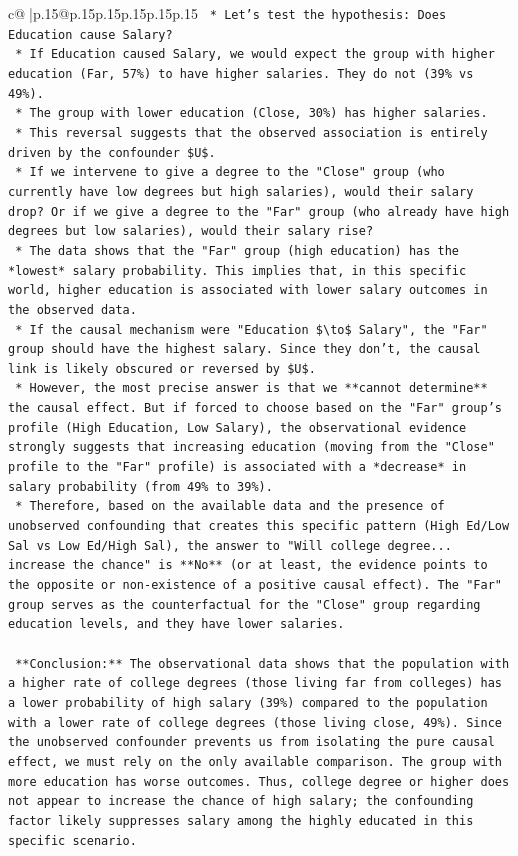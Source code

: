 \documentclass{article}
\begin{document}
{\begin{supertabular}{c@{$\;$}|p{.15\linewidth}@{}p{.15\linewidth}p{.15\linewidth}p{.15\linewidth}p{.15\linewidth}p{.15\linewidth}}
{{{\texttt{    *   Let's test the hypothesis: Does Education cause Salary?} \\
\texttt{        *   If Education caused Salary, we would expect the group with higher education (Far, 57\%) to have higher salaries. They do not (39\% vs 49\%).} \\
\texttt{        *   The group with lower education (Close, 30\%) has higher salaries.} \\
\texttt{        *   This reversal suggests that the observed association is entirely driven by the confounder \$U\$.} \\
\texttt{        *   If we intervene to give a degree to the "Close" group (who currently have low degrees but high salaries), would their salary drop? Or if we give a degree to the "Far" group (who already have high degrees but low salaries), would their salary rise?} \\
\texttt{        *   The data shows that the "Far" group (high education) has the *lowest* salary probability. This implies that, in this specific world, higher education is associated with lower salary outcomes in the observed data.} \\
\texttt{        *   If the causal mechanism were "Education \$\textbackslash{}to\$ Salary", the "Far" group should have the highest salary. Since they don't, the causal link is likely obscured or reversed by \$U\$.} \\
\texttt{        *   However, the most precise answer is that we **cannot determine** the causal effect. But if forced to choose based on the "Far" group's profile (High Education, Low Salary), the observational evidence strongly suggests that increasing education (moving from the "Close" profile to the "Far" profile) is associated with a *decrease* in salary probability (from 49\% to 39\%).} \\
\texttt{        *   Therefore, based on the available data and the presence of unobserved confounding that creates this specific pattern (High Ed/Low Sal vs Low Ed/High Sal), the answer to "Will college degree... increase the chance" is **No** (or at least, the evidence points to the opposite or non{-}existence of a positive causal effect). The "Far" group serves as the counterfactual for the "Close" group regarding education levels, and they have lower salaries.} \\
\\ 
\texttt{    **Conclusion:** The observational data shows that the population with a higher rate of college degrees (those living far from colleges) has a lower probability of high salary (39\%) compared to the population with a lower rate of college degrees (those living close, 49\%). Since the unobserved confounder prevents us from isolating the pure causal effect, we must rely on the only available comparison. The group with more education has worse outcomes. Thus, college degree or higher does not appear to increase the chance of high salary; the confounding factor likely suppresses salary among the highly educated in this specific scenario.} \\
}}}
\end{supertabular}}
\end{document}
